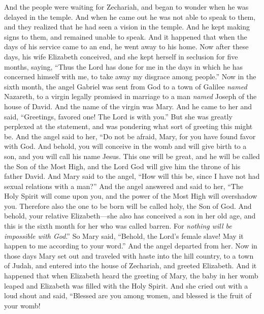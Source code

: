 \begin{biblechapter}
\verse And the people were waiting for Zechariah, and began to wonder when he was delayed in the temple.
\verse And when he came out he was not able to speak to them, and they realized that he had seen a vision in the temple. And he kept making signs to them, and remained unable to speak.
\verse And it happened that when the days of his service came to an end, he went away to his home.
\verse Now after these days, his wife Elizabeth conceived, and she kept herself in seclusion for five months, saying,
\verse “Thus the Lord has done for me in the days in which he has concerned himself with me, to take away my disgrace among people.”
 Now in the sixth month, the angel Gabriel was sent from God to a town of Galilee \textit{named} Nazareth,
\verse to a virgin legally promised in marriage to a man \textit{named} Joseph of the house of David. And the name of the virgin was Mary.
\verse And he came to her and said, “Greetings, favored one! The Lord is with you.”
\verse But she was greatly perplexed at the statement, and was pondering what sort of greeting this might be.
\verse And the angel said to her,
\verse “Do not be afraid, Mary, for you have found favor with God.
\verse And behold, you will conceive in the womb and will give birth to a son, 
and you will call his name Jesus.
\verse This one will be great, and he will be called the Son of the Most High, 
and the Lord God will give him the throne of his father David.
\verse And Mary said to the angel, “How will this be, since I have not had sexual relations with a man?”
\verse And the angel answered and said to her, “The Holy Spirit will come upon you, 
and the power of the Most High will overshadow you. 
Therefore also the one to be born will be called holy, the Son of God.
\verse And behold, your relative Elizabeth—she also has conceived a son in her old age, and this is the sixth month for her who was called barren.
\verse For \textit{nothing will be impossible with God}.”
\verse So Mary said, “Behold, the Lord’s female slave! May it happen to me according to your word.” And the angel departed from her.
 Now in those days Mary set out and traveled with haste into the hill country, to a town of Judah,
\verse and entered into the house of Zechariah, and greeted Elizabeth.
\verse And it happened that when Elizabeth heard the greeting of Mary, the baby in her womb leaped and Elizabeth was filled with the Holy Spirit.
\verse And she cried out with a loud shout and said, “Blessed are you among women, 
and blessed is the fruit of your womb!

\end{biblechapter}
